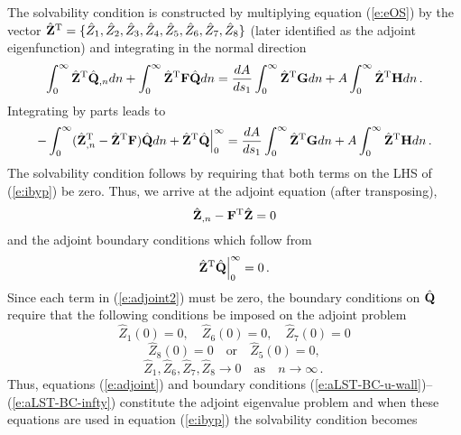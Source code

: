 The solvability condition is constructed by multiplying equation (\ref{e:eOS})
by the vector ${\hat{\bf Z}}^{\rm T} = \{\hat Z_1,\hat Z_2,\hat Z_3,\hat Z_4,\hat
Z_5,\hat Z_6,\hat Z_7,\hat Z_8\}$ (later identified as the adjoint
eigenfunction) and integrating in the normal direction
%
\begin{equation}
  \int_0^\infty {\hat{\bf Z}}^{\rm T} {\hat{\bf Q}}_{,n} dn + \int_0^\infty {\hat{\bf Z}}^{\rm T} {\bf F}
  {\hat{\bf Q}} dn = \frac{dA}{ds_1} 
            \int_0^\infty {\hat{\bf Z}}^{\rm T} {\bf G} dn + 
	    A \int_0^\infty {\hat{\bf Z}}^{\rm T} {\bf H} dn {\, .}
\end{equation}
%
Integrating by parts leads to
%
\begin{equation} \label{e:ibyp}
  -\int_0^\infty ( {\hat{\bf Z}}^{\rm T}_{,n} - {\hat{\bf Z}}^{\rm T} {\bf F} ) {\hat{\bf Q}} dn +
  {\hat{\bf Z}}^{\rm T} {\hat{\bf Q}} \Big |_0^\infty = \frac{dA}{ds_1} 
            \int_0^\infty {\hat{\bf Z}}^{\rm T} {\bf G} dn + 
	    A \int_0^\infty {\hat{\bf Z}}^{\rm T} {\bf H} dn {\, .}
\end{equation}
%
The solvability condition follows by requiring that both terms on the LHS of
(\ref{e:ibyp}) be zero.  Thus, we arrive at the adjoint equation (after
transposing),
%
\begin{equation} \label{e:adjoint}
  {\hat{\bf Z}}_{,n} - {\bf F}^{\rm T} {\hat{\bf Z}}  = 0
\end{equation}
%
and the adjoint boundary conditions which follow from
%
\begin{equation} \label{e:adjoint2}
  {\hat{\bf Z}}^{\rm T} {\hat{\bf Q}} \Big |_0^\infty = 0 {\, .}
\end{equation}
%
Since each term in (\ref{e:adjoint2}) must be zero, the boundary conditions on
${\hat{\bf Q}}$ require that the following conditions be imposed on the adjoint problem
%
\begin{equation}  \label{e:aLST-BC-u-wall}
  \hat Z_1(0) = 0 \comma \quad \hat Z_6(0) = 0 \comma \quad \hat Z_7(0) = 0
\end{equation}
\begin{equation} \label{e:aLST-BC-t-wall}
  \hat Z_8(0) = 0 \quad \mbox{or} \quad \hat Z_5(0) = 0 \comma
\end{equation} 
\begin{equation} \label{e:aLST-BC-infty}
  \hat Z_1, \hat Z_6, \hat Z_7, \hat Z_8 \rightarrow 0 \quad \mbox{as} 
  \quad n \rightarrow \infty \period
\end{equation}
%
Thus, equations (\ref{e:adjoint}) and boundary conditions
(\ref{e:aLST-BC-u-wall})--(\ref{e:aLST-BC-infty}) constitute the adjoint
eigenvalue problem and when these equations are used in equation
(\ref{e:ibyp}) the solvability condition becomes
